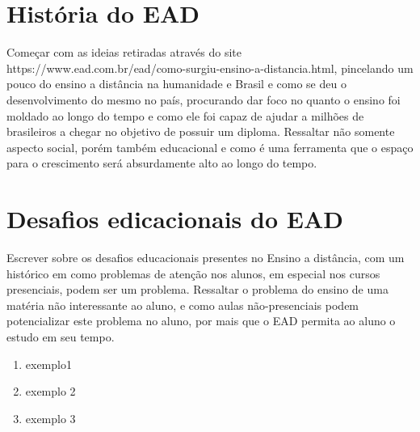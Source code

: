 
\section{História do \acrfull{EAD}}%
Começar com as ideias retiradas através do site https://www.ead.com.br/ead/como-surgiu-ensino-a-distancia.html, pincelando um pouco do ensino a distância na humanidade e Brasil e como se deu o desenvolvimento do mesmo no país, procurando dar foco no quanto o ensino foi moldado ao longo do tempo e como ele foi capaz de ajudar a milhões de brasileiros a chegar no objetivo de possuir um diploma. Ressaltar não somente aspecto social, porém também educacional e como é uma ferramenta que o espaço para o crescimento será absurdamente alto ao longo do tempo.


\section{Desafios edicacionais do \acrfull{EAD}}%
Escrever sobre os desafios educacionais presentes no Ensino a distância, com um histórico em como problemas de atenção nos alunos, em especial nos cursos presenciais, podem ser um problema. Ressaltar o problema do ensino de uma matéria não interessante ao aluno, e como aulas não-presenciais podem potencializar este problema no aluno, por mais que o EAD permita ao aluno o estudo em seu tempo.


\begin{enumerate}
	\item exemplo1
	\item exemplo 2
	\item exemplo 3
\end{enumerate}%

